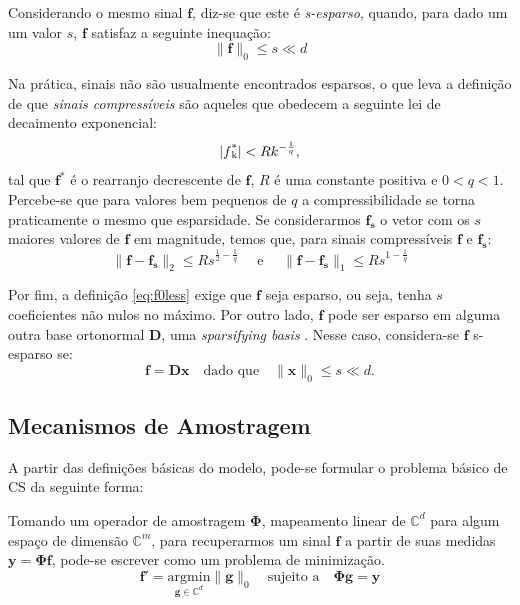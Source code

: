 \documentclass[cic,tc]{iiufrgs}
\def\SPSB#1#2{\rlap{\textsuperscript{#1}}\SB{#2}}
\def\SB#1{\textsubscript{#1}}
\renewcommand{\vec}[1]{\bm{#1}}
\begin{document}
Considerando o mesmo sinal $\vec{f}$, diz-se que este é \textit{s-esparso}, quando, para dado um um valor $s$, $\vec{f}$
satisfaz a seguinte inequação:
\begin{equation}
    \label{eq:f0less}
    \lVert \vec{f} \rVert_0 \le s \ll d
\end{equation} 

Na prática, sinais não são usualmente encontrados esparsos, o que leva a definição de que \textit{sinais compressíveis}
são aqueles que obedecem a seguinte lei de decaimento exponencial:
\begin{equation}
    \label{eq:compressiblesignal}
    | f\SPSB{*}{k} | < R k^{-\frac{1}{q}},  
\end{equation}
tal que $\vec{f}^* $ é o rearranjo decrescente de $\vec{f}$, $R$ é uma constante positiva e $0< q < 1$. Percebe-se
que para valores bem pequenos de $q$ a compressibilidade se torna praticamente o mesmo que esparsidade. Se considerarmos
$\vec{f_s}$ o vetor com os $s$ maiores valores de $\vec{f}$ em magnitude, temos que, para sinais compressíveis $\vec{f}$ e 
$\vec{f_s}$:
\begin{equation}
    \lVert \vec{f} - \vec{f_s} \rVert_2 \le Rs^{\frac{1}{2} - \frac{1}{q}} \hspace{1em} \text{ e } \hspace{1em}
    \lVert \vec{f} - \vec{f_s} \rVert_1 \le Rs^{1 - \frac{1}{q}} 
\end{equation} 

Por fim, a definição \eqref{eq:f0less} exige que $\vec{f}$ seja esparso, ou seja, tenha $s$ coeficientes não nulos
no máximo. Por outro lado, $\vec{f}$ pode ser esparso em alguma outra base ortonormal $\mathbf{D}$, uma \textit{sparsifying basis} 
\cite{CandesDecoLinear}. Nesse caso, considera-se $\vec{f}$ s-esparso se:
\begin{equation}
    \vec{f} = \mathbf{D}\vec{x} \hspace{1em} \text{dado que} \hspace{1em} \lVert \vec{x} \rVert_0 \le s \ll d.
\end{equation}


\subsection{Mecanismos de Amostragem}
A partir das definições básicas do modelo, pode-se formular o problema básico de CS da seguinte forma:

Tomando um operador de amostragem $\mathbf{\Phi}$, mapeamento linear de $\mathbb{C}^d$ para algum espaço de dimensão 
$\mathbb{C}^m$, para recuperarmos um sinal $\vec{f}$ a partir de suas medidas $\vec{y} = \mathbf{\Phi} \vec{f}$, pode-se escrever
como um problema de minimização.
\begin{equation}
    \label{eq:problem}
    \vec{f}' = \underset{\vec{g} \in \mathbb{C}^d}{\text{argmin}} \lVert \vec{g} \rVert_0 \hspace{1em} \text{sujeito a} \hspace{1em}
    \mathbf{\Phi} \vec{g} = \vec{y} 
\end{equation}
\end{document}
